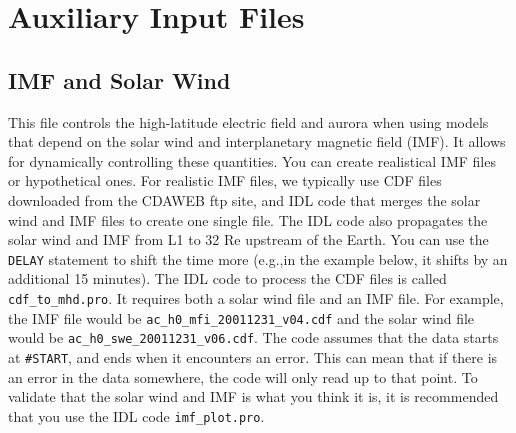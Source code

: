 
\section{Auxiliary Input Files}


\subsection{IMF and Solar Wind}

This file controls the high-latitude electric field and aurora when
using models that depend on the solar wind and interplanetary magnetic
field (IMF).  It allows for dynamically controlling these quantities.
You can create realistical IMF files or hypothetical ones.  For
realistic IMF files, we typically use CDF files downloaded from the
CDAWEB ftp site, and IDL code that merges the solar wind and IMF files
to create one single file.  The IDL code also propagates the solar
wind and IMF from L1 to 32 Re upstream of the Earth.  You can use the
{\tt DELAY} statement to shift the time more (e.g.,in the example
below, it shifts by an additional 15 minutes).  The IDL code to
process the CDF files is called {\tt cdf\_to\_mhd.pro}.  It requires
both a solar wind file and an IMF file. For example, the IMF file
would be {\tt ac\_h0\_mfi\_20011231\_v04.cdf} and the solar wind file
would be {\tt ac\_h0\_swe\_20011231\_v06.cdf}.  The code assumes that
the data starts at {\tt \#START}, and ends when it encounters an
error.  This can mean that if there is an error in the data somewhere,
the code will only read up to that point.  To validate that the solar
wind and IMF is what you think it is, it is recommended that you use
the IDL code {\tt imf\_plot.pro}.

